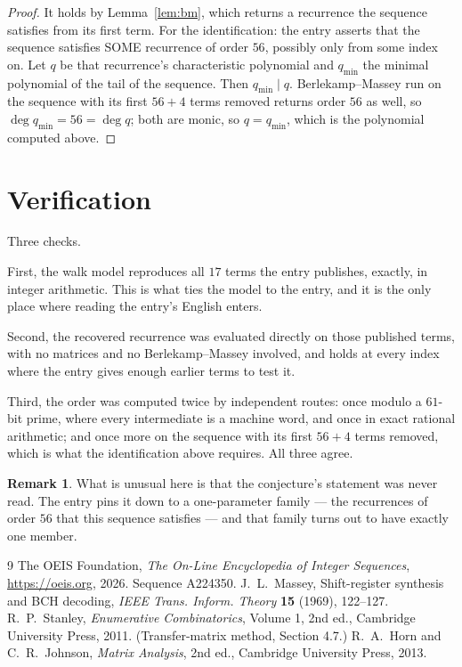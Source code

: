 \documentclass[11pt,a4paper]{article}
\theoremstyle{plain}
\theoremstyle{definition}
\newtheorem{remark}[theorem]{Remark}
\begin{document}
\begin{proof}
It holds by Lemma~\ref{lem:bm}, which returns a recurrence the sequence satisfies from its
first term. For the identification: the entry asserts that the sequence satisfies SOME
recurrence of order $56$, possibly only from some index on. Let $q$ be that recurrence's
characteristic polynomial and $q_{\min}$ the minimal polynomial of the tail of the sequence.
Then $q_{\min}\mid q$. Berlekamp--Massey run on the sequence with its first $56+4$ terms
removed returns order $56$ as well, so $\deg q_{\min}=56=\deg q$; both are monic, so
$q=q_{\min}$, which is the polynomial computed above.
\end{proof}

\section{Verification}

Three checks.

First, the walk model reproduces all $17$ terms the entry publishes, exactly, in integer
arithmetic. This is what ties the model to the entry, and it is the only place where reading
the entry's English enters.

Second, the recovered recurrence was evaluated directly on those published terms, with no
matrices and no Berlekamp--Massey involved, and holds at every index where the entry gives
enough earlier terms to test it.

Third, the order was computed twice by independent routes: once modulo a $61$-bit prime, where
every intermediate is a machine word, and once in exact rational arithmetic; and once more on
the sequence with its first $56+4$ terms removed, which is what the identification above
requires. All three agree.

\begin{remark}
What is unusual here is that the conjecture's statement was never read. The entry pins it down
to a one-parameter family --- the recurrences of order $56$ that this sequence satisfies
--- and that family turns out to have exactly one member.
\end{remark}

\begin{thebibliography}{9}
 The OEIS Foundation, \emph{The On-Line Encyclopedia of Integer
Sequences}, \url{https://oeis.org}, 2026. Sequence A224350.
 J.~L.~Massey, Shift-register synthesis and BCH decoding, \emph{IEEE
Trans. Inform. Theory} \textbf{15} (1969), 122--127.
 R.~P.~Stanley, \emph{Enumerative Combinatorics}, Volume 1, 2nd ed.,
Cambridge University Press, 2011. (Transfer-matrix method, Section 4.7.)
 R.~A.~Horn and C.~R.~Johnson, \emph{Matrix Analysis}, 2nd ed., Cambridge
University Press, 2013.
\end{thebibliography}
\end{document}
